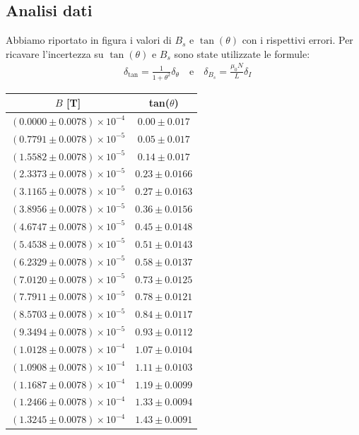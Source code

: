 \documentclass[a4paper]{article}
\begin{document}
\subsection{Analisi dati}
Abbiamo riportato in figura i valori di $B_s$ e $\tan(\theta)$ con i rispettivi errori.
Per ricavare l'incertezza su $\tan(\theta)$ e $B_s$ sono state utilizzate le formule:
\begin{align*}
	 & \delta_{\tan} = \frac {1}{1+\theta^2}\delta_\theta \quad \text{e} \quad \delta_{B_s} = \frac {\mu_0N}{L}\delta_I
\end{align*}

\begin{center}
\begin{tabular}{|c|c|}
\hline
$B$ [T] & tan($\theta$) \\
\hline
$(0.0000 \pm 0.0078) \times 10^{-4}$ & $0.00 \pm 0.017$ \\
$(0.7791 \pm 0.0078) \times 10^{-5}$ & $0.05 \pm 0.017$ \\
$(1.5582 \pm 0.0078) \times 10^{-5}$ & $0.14 \pm 0.017$ \\
$(2.3373 \pm 0.0078) \times 10^{-5}$ & $0.23 \pm 0.0166$ \\
$(3.1165 \pm 0.0078) \times 10^{-5}$ & $0.27 \pm 0.0163$ \\
$(3.8956 \pm 0.0078) \times 10^{-5}$ & $0.36 \pm 0.0156$ \\
$(4.6747 \pm 0.0078) \times 10^{-5}$ & $0.45 \pm 0.0148$ \\
$(5.4538 \pm 0.0078) \times 10^{-5}$ & $0.51 \pm 0.0143$ \\
$(6.2329 \pm 0.0078) \times 10^{-5}$ & $0.58 \pm 0.0137$ \\
$(7.0120 \pm 0.0078) \times 10^{-5}$ & $0.73 \pm 0.0125$ \\
$(7.7911 \pm 0.0078) \times 10^{-5}$ & $0.78 \pm 0.0121$ \\
$(8.5703 \pm 0.0078) \times 10^{-5}$ & $0.84 \pm 0.0117$ \\
$(9.3494 \pm 0.0078) \times 10^{-5}$ & $0.93 \pm 0.0112$ \\
$(1.0128 \pm 0.0078) \times 10^{-4}$ & $1.07 \pm 0.0104$ \\
$(1.0908 \pm 0.0078) \times 10^{-4}$ & $1.11 \pm 0.0103$ \\
$(1.1687 \pm 0.0078) \times 10^{-4}$ & $1.19 \pm 0.0099$ \\
$(1.2466 \pm 0.0078) \times 10^{-4}$ & $1.33 \pm 0.0094$ \\
$(1.3245 \pm 0.0078) \times 10^{-4}$ & $1.43 \pm 0.0091$ \\

\end{tabular}
\end{center}
\end{document}
